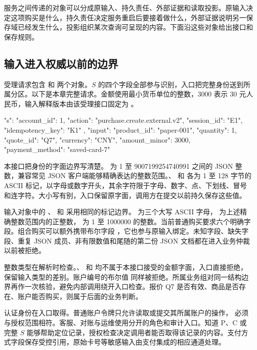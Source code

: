 服务之间传递的对象可以分成原输入、持久责任、外部证据和读取投影。原输入决定这项购买是什么，持久责任决定服务重启后要接着做什么，外部证据说明另一保存域已经发生什么，投影组织某次查询可呈现的内容。下面沿这些对象给出接口和保存规则。

\subsection{输入进入权威以前的边界}

受理请求包含  和  两个对象。$S$ 的四个字段全部参与识别，入口把完整身份送到所属分区。以下是本章完整请求。金额使用最小货币单位的整数，3000 表示 30 元人民币，输入解释版本由该受理接口固定为 。

\begin{BookCode}
{
  "s": {
    "account_id": 1,
    "action": "purchase.create.external.v2",
    "session_id": "E1",
    "idempotency_key": "K1"
  },
  "input": {
    "product_id": "paper-001",
    "quantity": 1,
    "quote_id": "Q7",
    "currency": "CNY",
    "amount_minor": 3000,
    "payment_method": "saved-card-7"
  }
}
\end{BookCode}

本接口把身份的字面边界写清楚。 为 1 至 9007199254740991 之间的 JSON 整数，兼容常见 JSON 客户端能够精确表达的整数范围。、 和  各为 1 至 128 字节的 ASCII 标记，以字母或数字开头，其余字符限于字母、数字、点、下划线、冒号和连字符。大小写有别，入口保留原字面，调用方在提交以前持久保存这些值。

输入对象中的 、 和  采用相同的标记边界。 为三个大写 ASCII 字母， 为上述精确整数范围内的正整数， 为 1 至 1000000 的整数。当前普通购买要求六个明确字段。组合购买可以额外携带布尔字段 ，它也参与原输入绑定。未知字段、缺失字段、重复 JSON 成员、非有限数值和尾随的第二份 JSON 文档都在进入业务仲裁以前被拒绝。

整数类型在解析时检查。、 和  均不属于本接口接受的金额字面，入口直接拒绝，保留输入类型的差别。账户编号的布尔值  同样被拒绝。所属业务组对同一结构边界再作一次核验，避免内部调用绕开入口检查。报价 Q7 是否有效、商品是否存在、账户能否购买，则属于后面的业务判断。

认证身份在入口取得。普通账户令牌只允许读取或提交其所属账户的操作， 必须与授权范围相符。客服、对账与运维使用分开的角色和审计入口。知道 P、C 或完整 $S$ 能够帮助定位记录，授权检查决定调用者能否取得该记录的内容。支付方式字段保存受控引用，原始卡号等敏感输入由支付集成的相应通道处理。

